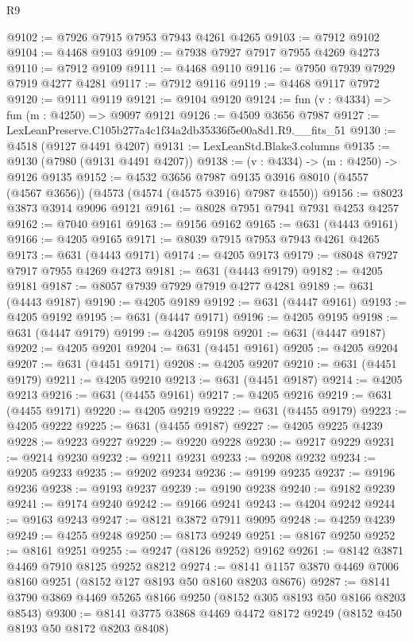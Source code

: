 \begin{lexlean}{R9}
\begin{coremodule}
@9102 := @7926 @7915 @7953 @7943 @4261 @4265
@9103 := @7912 @9102
@9104 := @4468 @9103
@9109 := @7938 @7927 @7917 @7955 @4269 @4273
@9110 := @7912 @9109
@9111 := @4468 @9110
@9116 := @7950 @7939 @7929 @7919 @4277 @4281
@9117 := @7912 @9116
@9119 := @4468 @9117 @7972
@9120 := @9111 @9119
@9121 := @9104 @9120
@9124 := fun (v : @4334) => fun (m : @4250) => @9097 @9121
@9126 := @4509 @3656 @7987
@9127 := LexLeanPreserve.C105b277a4c1f34a2db35336f5e00a8d1.R9.__fits_51
@9130 := @4518 (@9127 @4491 @4207)
@9131 := LexLeanStd.Blake3.columns
@9135 := @9130 (@7980 (@9131 @4491 @4207))
@9138 := (v : @4334) -> (m : @4250) -> @9126 @9135
@9152 := @4532
    @3656
    @7987
    @9135
    @3916
    @8010
    (@4557 (@4567 @3656))
    (@4573 (@4574 (@4575 @3916) @7987 @4550))
@9156 := @8023 @3873 @3914 @9096 @9121
@9161 := @8028 @7951 @7941 @7931 @4253 @4257
@9162 := @7040 @9161
@9163 := @9156 @9162
@9165 := @631 (@4443 @9161)
@9166 := @4205 @9165
@9171 := @8039 @7915 @7953 @7943 @4261 @4265
@9173 := @631 (@4443 @9171)
@9174 := @4205 @9173
@9179 := @8048 @7927 @7917 @7955 @4269 @4273
@9181 := @631 (@4443 @9179)
@9182 := @4205 @9181
@9187 := @8057 @7939 @7929 @7919 @4277 @4281
@9189 := @631 (@4443 @9187)
@9190 := @4205 @9189
@9192 := @631 (@4447 @9161)
@9193 := @4205 @9192
@9195 := @631 (@4447 @9171)
@9196 := @4205 @9195
@9198 := @631 (@4447 @9179)
@9199 := @4205 @9198
@9201 := @631 (@4447 @9187)
@9202 := @4205 @9201
@9204 := @631 (@4451 @9161)
@9205 := @4205 @9204
@9207 := @631 (@4451 @9171)
@9208 := @4205 @9207
@9210 := @631 (@4451 @9179)
@9211 := @4205 @9210
@9213 := @631 (@4451 @9187)
@9214 := @4205 @9213
@9216 := @631 (@4455 @9161)
@9217 := @4205 @9216
@9219 := @631 (@4455 @9171)
@9220 := @4205 @9219
@9222 := @631 (@4455 @9179)
@9223 := @4205 @9222
@9225 := @631 (@4455 @9187)
@9227 := @4205 @9225 @4239
@9228 := @9223 @9227
@9229 := @9220 @9228
@9230 := @9217 @9229
@9231 := @9214 @9230
@9232 := @9211 @9231
@9233 := @9208 @9232
@9234 := @9205 @9233
@9235 := @9202 @9234
@9236 := @9199 @9235
@9237 := @9196 @9236
@9238 := @9193 @9237
@9239 := @9190 @9238
@9240 := @9182 @9239
@9241 := @9174 @9240
@9242 := @9166 @9241
@9243 := @4204 @9242
@9244 := @9163 @9243
@9247 := @8121 @3872 @7911 @9095
@9248 := @4259 @4239
@9249 := @4255 @9248
@9250 := @8173 @9249
@9251 := @8167 @9250
@9252 := @8161 @9251
@9255 := @9247 (@8126 @9252) @9162
@9261 := @8142 @3871 @4469 @7910 @8125 @9252 @8212
@9274 := @8141 @1157 @3870 @4469 @7006 @8160 @9251 (@8152 @127 @8193 @50 @8160 @8203 @8676)
@9287 := @8141 @3790 @3869 @4469 @5265 @8166 @9250 (@8152 @305 @8193 @50 @8166 @8203 @8543)
@9300 := @8141 @3775 @3868 @4469 @4472 @8172 @9249 (@8152 @450 @8193 @50 @8172 @8203 @8408)

\end{coremodule}
\end{lexlean}
